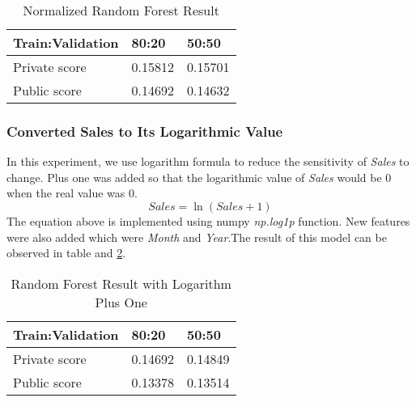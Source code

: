 \begin{table}[h]
	\centering
	\caption{Normalized Random Forest Result }
	\label{tab:random_forest_result_1}
	\begin{tabular}{|m{150pt}|m{50pt}|m{50pt}|}
		\hline
		\textbf{Train:Validation}& \textbf{80:20}& \textbf{50:50}  \\ \hline
		Private score & 0.15812 & 0.15701  \\ \hline
		Public score  & 0.14692 & 0.14632\\ \hline
	\end{tabular}
\end{table}

\subsubsection{Converted Sales to Its Logarithmic Value}
In this experiment, we use logarithm formula to reduce the sensitivity of   \textit{Sales} to change. Plus one was added so that the logarithmic value of \textit{Sales} would be 0 when the real value was 0.
\begin{equation}
\label{eq:logarithm plus one}
Sales = \ln (Sales + 1)
\end{equation}
The equation above is implemented using numpy \textit{np.log1p} function.
New features were also added which were \textit{Month} and \textit{Year}.The result of this model can be observed in table and \ref{tab:rf_log_2}.
\begin{table}[h]
	\centering
	\caption{Random Forest Result with Logarithm Plus One}
	\label{tab:rf_log_2}
	\begin{tabular}{|m{150pt}|m{50pt}|m{50pt}|}
		\hline
		\textbf{Train:Validation}&\textbf{80:20}&\textbf{50:50} \\ \hline
		Private score & 0.14692 & 0.14849 \\ \hline
		Public score  & 0.13378 & 0.13514 \\ \hline
	\end{tabular}
\end{table}



